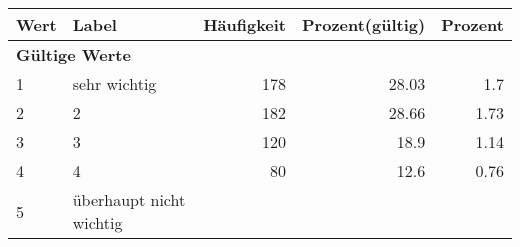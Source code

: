      \begin{longtable}{lXrrr}
     \toprule
     \textbf{Wert} & \textbf{Label} & \textbf{Häufigkeit} & \textbf{Prozent(gültig)} & \textbf{Prozent} \\
     \endhead
     \midrule
     \multicolumn{5}{l}{\textbf{Gültige Werte}}\\

     1 &
     \multicolumn{1}{X}{ sehr wichtig   } &


       \num{178} &
       \num[round-mode=places,round-precision=2]{28,03} &
         \num[round-mode=places,round-precision=2]{1,7} \\

     2 &
     \multicolumn{1}{X}{ 2   } &


       \num{182} &
       \num[round-mode=places,round-precision=2]{28,66} &
         \num[round-mode=places,round-precision=2]{1,73} \\

     3 &
     \multicolumn{1}{X}{ 3   } &


       \num{120} &
       \num[round-mode=places,round-precision=2]{18,9} &
         \num[round-mode=places,round-precision=2]{1,14} \\

     4 &
     \multicolumn{1}{X}{ 4   } &


       \num{80} &
       \num[round-mode=places,round-precision=2]{12,6} &
         \num[round-mode=places,round-precision=2]{0,76} \\

     5 &
     \multicolumn{1}{X}{ überhaupt nicht wichtig   } &



\end{longtable}
